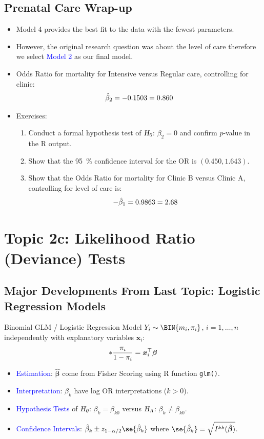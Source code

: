 \documentclass[oneside]{book}\usepackage[]{graphicx}\usepackage[svgnames]{xcolor}
\let\exp\relax%
\let\log\relax%
\newcommand{\HN}{\textsl{H}_{\textsl{0}}}%
\newcommand{\HA}{\textsl{H}_{\textsl{A}}}%
\providecommand{\Vector}[1]{\bm{#1}}%
\begin{document}
\subsection*{Prenatal Care Wrap-up}
\begin{itemize}
      \item Model 4 provides the best fit to the data with the fewest parameters.
      \item However, the original research question was about the level of care therefore we
            select \textcolor{Blue}{Model 2} as our final model.
      \item Odds Ratio for mortality for Intensive versus Regular care, controlling for clinic:
            \[ \exp{\hat{\beta}_2}=\exp{-0.1503}=0.860 \]
      \item Exercises:
            \begin{enumerate}[1.]
                  \item Conduct a formal hypothesis test of $ \HN $: $ \beta_2=0 $ and confirm $ p $-value in the R output.
                  \item Show that the \qty{95}{\percent} confidence interval for the OR is $ (0.450,1.643) $.
                  \item Show that the Odds Ratio for mortality for Clinic B versus Clinic A, controlling for
                        level of care is:
                        \[ \exp{-\hat{\beta}_1}=\exp{0.9863}=2.68 \]
            \end{enumerate}
\end{itemize}

\section*{Topic 2c: Likelihood Ratio (Deviance) Tests}
\subsection*{Major Developments From Last Topic: Logistic Regression Models}
\begin{Regular}{Binomial GLM / Logistic Regression Model}
      $ Y_i \sim \BIN{m_i,\pi_i} $, $ i=1,\ldots,n $ independently with explanatory variables $ \Vector{x}_i $:
      \[ \log*{\frac{\pi_i}{1-\pi_i}}=\Vector{x}_i^\top \Vector{\beta} \]
\end{Regular}
\begin{itemize}
      \item \textcolor{Blue}{Estimation}: $ \hat{\Vector{\beta}} $ come from Fisher Scoring using R function \texttt{glm()}.
      \item \textcolor{Blue}{Interpretation}: $ \beta_k $ have log OR interpretations ($ k>0 $).
      \item \textcolor{Blue}{Hypothesis Tests} of $ \HN $: $ \beta_k=\beta_{k0} $ versus $ \HA $: $ \beta_k\ne \beta_{k0} $.
      \item \textcolor{Blue}{Confidence Intervals}: $ \hat{\beta}_k\pm z_{1-\alpha/2}\se{\hat{\beta}_k} $ where $ \se{\hat{\beta}_k}=\sqrt{I^{kk}(\hat{\Vector{\beta}})} $.
\end{itemize}
\end{document}
